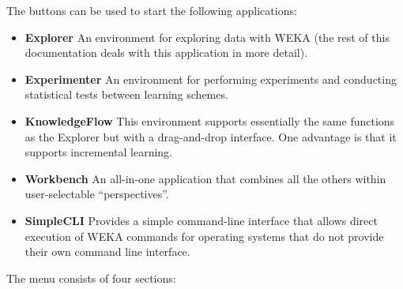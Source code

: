 The buttons can be used to start the following applications:

		\begin{itemize}
			\item \textbf{Explorer} An environment for exploring data with
WEKA (the rest of this documentation deals with this application in more detail).
			\item \textbf{Experimenter} An environment for performing experiments and conducting statistical tests
between learning schemes.
			\item \textbf{KnowledgeFlow} This environment supports essentially
the same functions as the Explorer but with a drag-and-drop
interface. One advantage is that it supports incremental learning.
                        \item \textbf{Workbench} An all-in-one application that combines all the others
                        within user-selectable ``perspectives''.
			\item \textbf{SimpleCLI} Provides a simple command-line interface
that allows direct execution of WEKA commands for operating systems
that do not provide their own command line interface.
		\end{itemize}




The menu consists of four sections:

